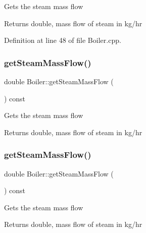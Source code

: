 Gets the steam mass flow \begin{DoxyReturn}{Returns}
double, mass flow of steam in kg/hr 
\end{DoxyReturn}


Definition at line 48 of file Boiler.\+cpp.

\mbox{\label{class_boiler_a4101e71234995558a451dcab145b5fc9}} 
\subsubsection{\texorpdfstring{get\+Steam\+Mass\+Flow()}{getSteamMassFlow()}\hspace{0.1cm}{\footnotesize\ttfamily [2/3]}}
{\footnotesize\ttfamily double Boiler\+::get\+Steam\+Mass\+Flow (\begin{DoxyParamCaption}{ }\end{DoxyParamCaption}) const}

Gets the steam mass flow \begin{DoxyReturn}{Returns}
double, mass flow of steam in kg/hr 
\end{DoxyReturn}
\mbox{\label{class_boiler_a4101e71234995558a451dcab145b5fc9}} 
\subsubsection{\texorpdfstring{get\+Steam\+Mass\+Flow()}{getSteamMassFlow()}\hspace{0.1cm}{\footnotesize\ttfamily [3/3]}}
{\footnotesize\ttfamily double Boiler\+::get\+Steam\+Mass\+Flow (\begin{DoxyParamCaption}{ }\end{DoxyParamCaption}) const}

Gets the steam mass flow \begin{DoxyReturn}{Returns}
double, mass flow of steam in kg/hr 
\end{DoxyReturn}
\mbox{\label{class_boiler_a99d4bbace6ef20bcbdc4b0cfcdc43213}} 
